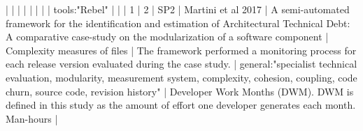 |    |            |      |                                                                      |                                                                                                                                                                          |                                                                                                                                                                                                                                                            |                                                                                                                                                                                                                                                                      | tools:"Rebel"                                                                                                                                                                                                                                                                                            |                                                                                                                                                                                                                                                                                                                                                                                                                                                                                              |
|  1 |          2 | SP2  | Martini et al 2017                                                   | A semi-automated framework for the identification and estimation of Architectural Technical Debt: A comparative case-study on the modularization of a software component | Complexity measures of files                                                                                                                                                                                                                             | The framework performed a monitoring process for each release version evaluated during the case study.                                                                                                                                                             | general:"specialist technical evaluation, modularity, measurement system, complexity, cohesion, coupling, code churn, source code, revision history"                                                                                                                                                     | Developer Work Months (DWM). DWM is defined in this study as the amount of effort one developer generates each month.  Man-hours                                                                                                                                                                                                                                                                                                                                                         |
